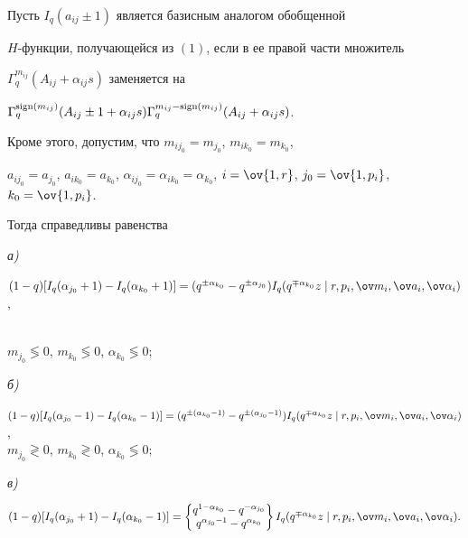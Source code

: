  


\begin{thm} 


Пусть $I_q(a_{i j}\pm1)$ является базисным аналогом обобщенной 


$H$-функции, получающейся из $(1)$, если в ее правой части множитель 


$\Gamma^{m_{i j}}_q(A_{i j}+\alpha_{i j}s)$ заменяется на 


$\Gamma^{\sign(m_{i j})}_q(A_{i j}\pm1+\alpha_{i j}s) 


\Gamma^{m_{i j}-\sign(m_{i j})}_q(A_{i j}+\alpha_{i j}s)$. 


Кроме этого, допустим, что $m_{i j_0}=m_{j_0}$, $m_{i k_0}=m_{k_0}$, 


$a_{i j_0}=a_{j_0}$, $a_{i k_0}=a_{k_0}$, $\alpha_{i j_0}=\alpha_{i 


k_0}=\alpha_{k_0}$, $i=\ov{1,r}$, $j_0=\ov{1,p_i}$, $k_0=\ov{1,p_i}$. 


Тогда справедливы равенства 


 


{\em а)} 


$(1-q)[I_q(\alpha_{j_0}+1)-I_q(\alpha_{k_0}+1)]= 


(q^{\pm\alpha_{k_0}}-q^{\pm\alpha_{j_0}}) 


I_q(q^{\mp\alpha_{k_0}}z\mid 


r, p_i,\ov m_i,\ov a_i,\ov\alpha_i)$, 


\\ $m_{j_0}\lessgtr0$, $m_{k_0}\lessgtr0$, $\alpha_{k_0}\lessgtr0;$ 


\smallskip


 


{\em б)} 


$(1-q)[I_q(\alpha_{j_0}-1)-I_q(\alpha_{k_0}-1)]= 


(q^{\pm(\alpha_{k_0}-1)}-q^{\pm(\alpha_{j_0}-1)}) 


I_q(q^{\mp\alpha_{k_0}}z\mid 


r, p_i,\ov m_i,\ov a_i,\ov\alpha_i)$, \\


$m_{j_0}\gtrless0$, $m_{k_0}\gtrless0$, $\alpha_{k_0}\lessgtr0;$


 


{\em в)} 


$(1-q)[I_q(\alpha_{j_0}+1)-I_q(\alpha_{k_0}-1)]= 


\left\{\begin{matrix}q^{1-\alpha_{k_0}}-q^{-\alpha_{j_0}} \\ 


q^{\alpha_{j_0}-1}-q^{\alpha_{k_0}}\end{matrix}\right\} 


I_q(q^{\mp\alpha_{k_0}}z\mid 


r, p_i,\ov m_i,\ov a_i,\ov\alpha_i).$


\end{thm} 



